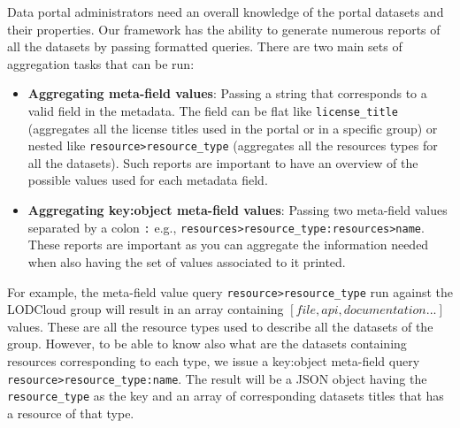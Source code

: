 \documentclass[runningheads,a4paper]{llncs}
\begin{document}
Data portal administrators need an overall knowledge of the portal datasets and their properties. Our framework has the ability to generate numerous reports of all the datasets by passing formatted queries. There are two main sets of aggregation tasks that can be run:
\begin{itemize}
  \item \textbf{Aggregating meta-field values}: Passing a string that corresponds to a valid field in the metadata. The field can be flat like \texttt{license\_title} (aggregates all the license titles used in the portal or in a specific group) or nested like \texttt{resource>resource\_type} (aggregates all the resources types for all the datasets). Such reports are important to have an overview of the possible values used for each metadata field.
  \item \textbf{Aggregating key:object meta-field values}: Passing two meta-field values separated by a colon \texttt{:} e.g., \texttt{resources>resource\_type:resources>name}. These reports are important as you can aggregate the information needed when also having the set of values associated to it printed.
\end{itemize}

For example, the meta-field value query \texttt{resource>resource\_type} run against the LODCloud group will result in an array containing $[file,api,documentation ...]$ values. These are all the resource types used to describe all the datasets of the group. However, to be able to know also what are the datasets containing resources corresponding to each type, we issue a key:object meta-field query \texttt{resource>resource\_type:name}. The result will be a JSON object having the \texttt{resource\_type} as the key and an array of corresponding datasets titles that has a resource of that type.
\end{document}
